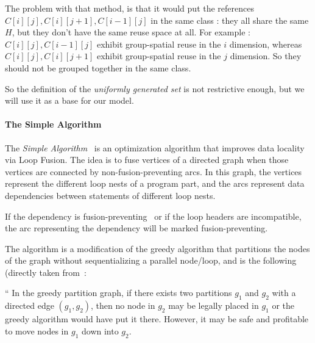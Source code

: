 \documentclass[paper=a4, fontsize=11.5pt]{scrartcl}
\numberwithin{equation}{section}        %
\numberwithin{figure}{section}          %
\numberwithin{table}{section}               %
\begin{document}
            The problem with that method, is that it would put the references
            $C[i][j],C[i][j+1],C[i-1][j]$ in the same class : they all share the
            same $H$, but they don't have the same reuse space at all.
            For example : $C[i][j],C[i-1][j]$ exhibit group-spatial reuse in the $i$ dimension,
            whereas $C[i][j],C[i][j+1]$ exhibit group-spatial reuse in the $j$ dimension. So they
            should not be grouped together in the same class.
            \medskip

            So the definition of the \textit{uniformly generated set} is not restrictive enough,
            but we will use it as a base for our model.



        \paragraph{The Simple Algorithm}
            The \textit{Simple Algorithm}~\cite{Kennedy94maximizingloop} is an
            optimization algorithm that improves data locality via Loop Fusion.
            The idea is to fuse vertices of a directed graph when those vertices
            are connected by non-fusion-preventing arcs.
            In this graph, the vertices represent the different loop nests of a program part,
            and the arcs represent data dependencies between statements of different loop nests.

            If the dependency is fusion-preventing~\cite{Bacon:1994:CTH:197405.197406} or if the loop headers are incompatible,
            the arc representing the dependency will be marked fusion-preventing.

            The algorithm is a modification of the greedy algorithm that partitions
            the nodes of the graph without sequentializing a parallel node/loop, and
            is the following (directly taken from~\cite{Kennedy94maximizingloop}:
            \medskip

            ``  In the greedy partition graph, if there exists two partitions $g_1$
                and $g_2$ with a directed edge $(g_1,g_2)$, then no node in $g_2$
                may be legally placed in $g_1$ or the greedy algorithm would have put it
                there. However, it may be safe and profitable to move nodes in $g_1$
                down into $g_2$.
\end{document}
